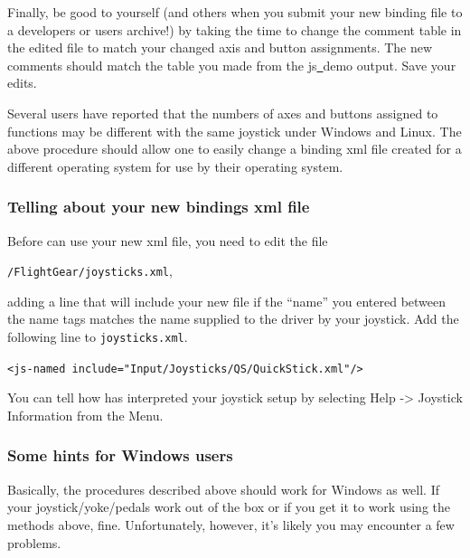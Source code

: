 Finally, be good to yourself (and others when you submit your new binding file to a \FlightGear{} developers or users archive!) by taking the time to change the comment table in the edited file to match your changed axis and button assignments.  The new comments should match the table you made from the js\underline{~}demo output.  Save your edits.

Several users have reported that the numbers of axes and buttons assigned to functions may be different with the same joystick under Windows and Linux.  The above procedure should allow one to easily change a binding xml file created for a different operating system for use by their operating system.

\subsubsection{Telling \FlightGear{} about your new bindings xml file\label{telling}}
Before \FlightGear{} can use your new xml file, you need to edit the file

\noindent
 \texttt{/FlightGear/joysticks.xml},


\noindent
adding a line that will include your new file if the ``name'' you entered between the name tags matches the name supplied to the driver by your joystick.  Add the following line to \texttt{joysticks.xml}.
\medskip

\noindent
	\texttt{<js-named include="Input/Joysticks/QS/QuickStick.xml"/>}
\medskip

You can tell how \FlightGear{} has interpreted your joystick setup by selecting
Help -> Joystick Information from the Menu.

\subsubsection{Some hints for Windows users\label{joyxp}}
Basically, the procedures described above should work for Windows as well. If your joystick/yoke/pedals work out of the box or if you get it to work using the methods above, fine. Unfortunately, however, it's likely you may encounter a few problems.

